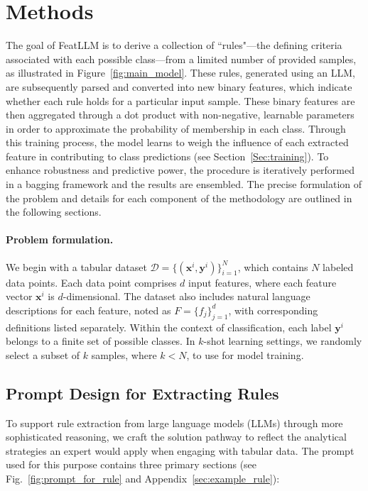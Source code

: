 \section{Methods}
The goal of \textsf{FeatLLM} is to derive a collection of ``rules"—the defining criteria associated with each possible class—from a limited number of provided samples, as illustrated in Figure~\ref{fig:main_model}. These rules, generated using an LLM, are subsequently parsed and converted into new binary features, which indicate whether each rule holds for a particular input sample. These binary features are then aggregated through a dot product with non-negative, learnable parameters in order to approximate the probability of membership in each class. Through this training process, the model learns to weigh the influence of each extracted feature in contributing to class predictions (see Section~\ref{Sec:training}). To enhance robustness and predictive power, the procedure is iteratively performed in a bagging framework and the results are ensembled. The precise formulation of the problem and details for each component of the methodology are outlined in the following sections.

\vspace*{-0.12in}
\paragraph{Problem formulation.} We begin with a tabular dataset $\mathcal{D} = \{(\mathbf{x}^i, \mathbf{y}^i)\}_{i=1}^{N}$, which contains $N$ labeled data points. Each data point comprises $d$ input features, where each feature vector $\mathbf{x}^i$ is $d$-dimensional. The dataset also includes natural language descriptions for each feature, noted as $F = \{f_j\}_{j=1}^{d}$, with corresponding definitions listed separately. Within the context of classification, each label $\mathbf{y}^i$ belongs to a finite set of possible classes. In $k$-shot learning settings, we randomly select a subset of $k$ samples, where $k<N$, to use for model training.

\subsection{Prompt Design for Extracting Rules}
\label{Sec:prompt_design}
To support rule extraction from large language models (LLMs) through more sophisticated reasoning, we craft the solution pathway to reflect the analytical strategies an expert would apply when engaging with tabular data. The prompt used for this purpose contains three primary sections (see Fig.~\ref{fig:prompt_for_rule} and Appendix~\ref{sec:example_rule}):

